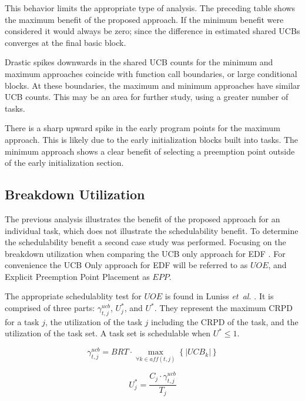 This behavior limits the appropriate type of analysis. The preceding
table shows the maximum benefit of the proposed approach. If the
minimum benefit were considered it would always be zero; since the
difference in estimated shared UCBs converges at the final basic
block.

Drastic spikes downwards in the shared UCB counts for the minimum and
maximum approaches coincide with function call boundaries, or large
conditional blocks. At these boundaries, the maximum and minimum
approaches have similar UCB counts. This may be an area for further
study, using a greater number of tasks.

There is a sharp upward spike in the early program points for the
maximum approach. This is likely due to the early initialization
blocks built into tasks. The minimum approach shows a clear benefit of
selecting a preemption point outside of the early initialization
section. 

\subsection{Breakdown Utilization}

The previous analysis illustrates the benefit of the proposed
approach for an individual task, which does not illustrate the
schedulability benefit. To determine the schedulability benefit a
second case study was performed. Focusing on the breakdown utilization
when comparing the UCB only approach for EDF \cite{lunniss:13}. For
convenience the UCB Only approach for EDF will be referred to as
${UOE}$, and Explicit Preemption Point Placement as ${EPP}$.

The appropriate schedulablity test for ${UOE}$ is found in
Luniss \emph{et~al.} \cite{lunniss:13}. It is comprised of three
parts: ${\gamma^{ucb}_{t,j}}$, ${U^*_j}$, and ${U^*}$. They represent
the maximum CRPD for a task ${j}$, the utilization of the task ${j}$
including the CRPD of the task, and the utilization of the task set.
A task set is schedulable when ${U^* \le 1}$.

\begin{equation}
  \gamma^{ucb}_{t,j} = BRT \cdot \max\limits_{\forall k \in aff(t,j)}
  \left\{ \left| UCB_k \right| \right\}
\end{equation}

\begin{equation}
  U^*_j = \frac{C_j \cdot \gamma^{ucb}_{t,j}}{T_j}
\end{equation}


